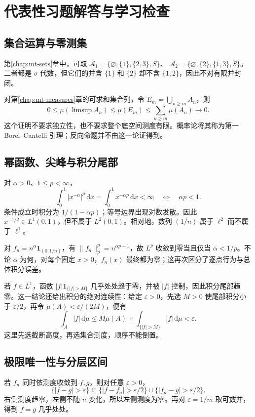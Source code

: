 \setcounter{chapter}{0} %
\chapter{代表性习题解答与学习检查}
\label{app:mt-exercises}

\section{集合运算与零测集}
第\ref{chap:mt-sets}章中，可取
$\mathcal A_1=\{\varnothing,\{1\},\{2,3\},S\}$、
$\mathcal A_2=\{\varnothing,\{2\},\{1,3\},S\}$。
二者都是 $\sigma$ 代数，但它们的并含 $\{1\}$ 和 $\{2\}$ 却不含 $\{1,2\}$，因此不对有限并封闭。

对第\ref{chap:mt-measures}章的可求和集合列，令 $E_m=\bigcup_{n\geq m}A_n$，则
\[
 0\leq\mu(\limsup A_n)\leq\mu(E_m)
 \leq\sum_{n\geq m}\mu(A_n)\longrightarrow0.
\]
这个证明不要求独立性，也不要求整个底空间测度有限。概率论将其称为第一 Borel--Cantelli 引理；反向命题并不由这一论证得到。

\section{幂函数、尖峰与积分尾部}
对 $\alpha>0$、$1\leq p<\infty$，
\[
 \int_0^1|x^{-\alpha}|^p\,\mathrm dx
 =\int_0^1x^{-\alpha p}\,\mathrm dx<\infty
 \quad\Longleftrightarrow\quad \alpha p<1.
\]
条件成立时积分为 $1/(1-\alpha p)$；等号边界出现对数发散。因此 $x^{-1/2}\in L^1(0,1)$，但不属于 $L^2(0,1)$。相对地，数列 $(1/n)$ 属于 $\ell^2$ 而不属于 $\ell^1$。

对 $f_n=n^\alpha\mathbf1_{(0,1/n)}$，有
$\|f_n\|_p^p=n^{\alpha p-1}$，故 $L^p$ 收敛到零当且仅当 $\alpha<1/p$。不论 $\alpha$ 为何，对每个固定 $x>0$，$f_n(x)$ 最终都为零；这再次区分了逐点行为与总体积分误差。

若 $f\in L^1$，函数 $|f|\mathbf1_{\{|f|>M\}}$ 几乎处处趋于零，并被 $|f|$ 控制，因此积分尾部趋零。这一结论还给出积分的绝对连续性：给定 $\varepsilon>0$，先选 $M>0$ 使尾部积分小于 $\varepsilon/2$，再令 $\mu(A)<\varepsilon/(2M)$，便有
\[
 \int_A|f|\,\mathrm d\mu
 \leq M\mu(A)+\int_{\{|f|>M\}}|f|\,\mathrm d\mu<\varepsilon.
\]
这里先选截断高度，再选集合测度，顺序不能倒置。

\section{极限唯一性与分层区间}
若 $f_n$ 同时依测度收敛到 $f,g$，则对任意 $\varepsilon>0$，
\[
 \{|f-g|>\varepsilon\}
 \subseteq\{|f-f_n|>\varepsilon/2\}\cup\{|f_n-g|>\varepsilon/2\}.
\]
右侧测度趋零，左侧不随 $n$ 变化，所以左侧测度为零。再对 $\varepsilon=1/m$ 取可数并，得到 $f=g$ 几乎处处。

